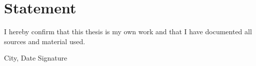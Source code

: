 \chapter*{Statement}
\thispagestyle{empty}

I hereby confirm that this thesis is my own work and that I have documented all sources and material used.

\vspace{2cm}
\noindent
City, Date \hfill Signature

